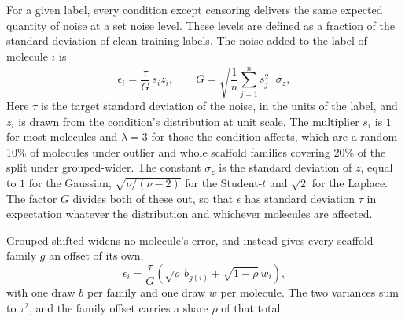 For a given label, every condition except censoring delivers the same expected quantity of noise at a set noise level. These levels are defined as a fraction of the standard deviation of clean training labels. The noise added to the label of molecule $i$ is
\begin{equation}
\epsilon_i = \frac{\tau}{G}\,s_i z_i,
\qquad
G = \sqrt{\frac{1}{n}\sum_{j=1}^{n} s_j^{2}}\;\;\sigma_z,
\label{eq:dose_matching}
\end{equation}
Here $\tau$ is the target standard deviation of the noise, in the units of the label, and $z_i$ is
drawn from the condition's distribution at unit scale. The multiplier $s_i$ is $1$ for most
molecules and $\lambda = 3$ for those the condition affects, which are a random 10\% of molecules
under outlier and whole scaffold families covering 20\% of the split under grouped-wider. The
constant $\sigma_z$ is the standard deviation of $z$, equal to $1$ for the Gaussian,
$\sqrt{\nu/(\nu-2)}$ for the Student-$t$ and $\sqrt{2}$ for the Laplace. The factor $G$ divides both
of these out, so that $\epsilon$ has standard deviation $\tau$ in expectation whatever the
distribution and whichever molecules are affected.

Grouped-shifted widens no molecule's error, and instead gives every scaffold family $g$ an offset of
its own,
\begin{equation}
\epsilon_i = \frac{\tau}{G}\left(\sqrt{\rho}\,b_{g(i)} + \sqrt{1-\rho}\,w_i\right),
\label{eq:grouped_shifted}
\end{equation}
with one draw $b$ per family and one draw $w$ per molecule. The two variances sum to $\tau^{2}$, and
the family offset carries a share $\rho$ of that total.

